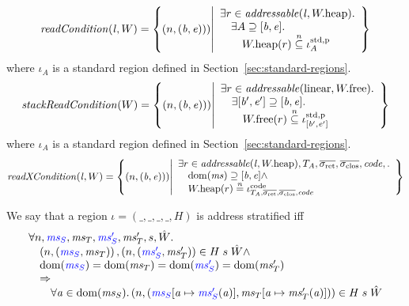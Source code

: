 \documentclass[a4paper]{article}
\begin{document}
\[
  \readCond{\lin,W} = \left\{ \npair{(\baddr,\eaddr})) \middle| 
    \begin{array}{l}
      \exists r \in \addressable{\lin, \pwheap} \ldotp \\
      \quad \exists A \supseteq [\baddr,\eaddr] \ldotp \\
      \qquad \pwheap(r) \nsubeq \stdreg{A}{\pur}
    \end{array}
  \right\}
\]
where $\iota_A$ is a standard region defined in Section~\ref{sec:standard-regions}.
\[
  \stackReadCond{W} = \left\{ \npair{(\baddr,\eaddr})) \middle| 
    \begin{array}{l}
      \exists r \in \addressable{\linear, \pwfree} \ldotp \\
      \quad \exists [\baddr',\eaddr'] \supseteq [\baddr,\eaddr] \ldotp \\
      \qquad \pwfree(r) \nsubeq \stdreg{[\baddr',\eaddr']}{\pur}
    \end{array}
  \right\}
\]
where $\iota_A$ is a standard region defined in Section~\ref{sec:standard-regions}.
\[
  \xReadCond{\lin,W} = \left\{ \npair{(\baddr,\eaddr})) \middle| 
    \begin{array}{l}
      \exists r \in \addressable{\lin, \pwheap}, \ta, \sigrets, \sigcloss, \code,  \ldotp\\
      \quad \dom(\ms) \supseteq [\baddr,\eaddr] \wedge \\
      \quad \pwheap(r) \nequal \codereg{\ta,\sigrets,\sigcloss,\code}
    \end{array}
  \right\}
\]

\begin{definition}
  \label{def:address-stratified}
  We say that a region $\iota = (\_,\_,\_,\_,H)$ is address stratified iff
  \[
    \begin{array}{l}
      \forall n, \src{\ms_S},\ms_T,\src{\ms_S'},\ms_T',s,\hat{W}\ldotp \\
      \quad \npair{\stpair{\ms}{\ms}}, \npair{\stpair[.]{\ms_S'}{\ms_T'}} \in H \; s \; \hat{W} \wedge \\
      \quad \dom(\src{\ms_S}) = \dom(\ms_T) = \dom(\src{\ms_S'}) = \dom(\ms_T') \\
      \quad \Rightarrow \\
      \qquad \forall \aaddr \in \dom(\ms_S) \ldotp \npair{(\src{\ms_S}\update{\aaddr}{\src{\ms_S'}(\aaddr)},\ms_T\update{\aaddr}{\ms_T'(\aaddr)})} \in H \; s \; \hat{W}
    \end{array}
  \]
\end{definition}
\end{document}

